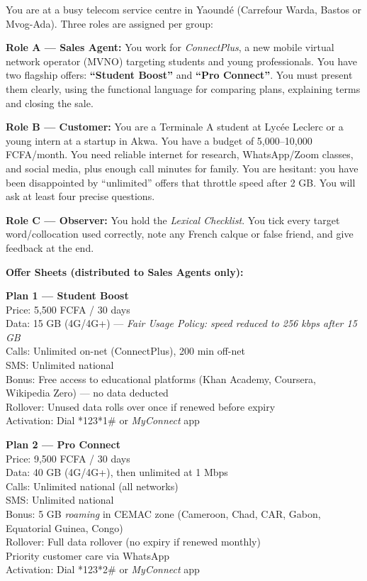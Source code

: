 \documentclass[11pt]{article}
\newcounter{popsec}
\newcounter{popsub}
\newcommand{\courssub}[1]{%
  \stepcounter{popsub}%
  \par\vspace{9pt}\noindent{\popxbold\fontsize{11.5}{13}\selectfont\color{popink}{\color{poporange}\thepopsec.\thepopsub}\hspace{6pt}#1}\par\nopagebreak\vspace{4pt}
}
\begin{document}
\courssub{Situation}
\begin{textebox}
You are at a busy telecom service centre in Yaoundé (Carrefour Warda, Bastos or Mvog-Ada). Three roles are assigned per group:

\textbf{Role A — Sales Agent:} You work for \textit{ConnectPlus}, a new mobile virtual network operator (MVNO) targeting students and young professionals. You have two flagship offers: \textbf{“Student Boost”} and \textbf{“Pro Connect”}. You must present them clearly, using the functional language for comparing plans, explaining terms and closing the sale.

\textbf{Role B — Customer:} You are a Terminale A student at Lycée Leclerc or a young intern at a startup in Akwa. You have a budget of 5,000–10,000 FCFA/month. You need reliable internet for research, WhatsApp/Zoom classes, and social media, plus enough call minutes for family. You are hesitant: you have been disappointed by “unlimited” offers that throttle speed after 2 GB. You will ask at least four precise questions.

\textbf{Role C — Observer:} You hold the \textit{Lexical Checklist}. You tick every target word/collocation used correctly, note any French calque or false friend, and give feedback at the end.

\textbf{Offer Sheets (distributed to Sales Agents only):}

\textbf{Plan 1 — Student Boost} \\
Price: 5,500 FCFA / 30 days \\
Data: 15 GB (4G/4G+) — \textit{Fair Usage Policy: speed reduced to 256 kbps after 15 GB} \\
Calls: Unlimited on-net (ConnectPlus), 200 min off-net \\
SMS: Unlimited national \\
Bonus: Free access to educational platforms (Khan Academy, Coursera, Wikipedia Zero) — no data deducted \\
Rollover: Unused data rolls over once if renewed before expiry \\
Activation: Dial *123*1\# or \textit{MyConnect} app

\textbf{Plan 2 — Pro Connect} \\
Price: 9,500 FCFA / 30 days \\
Data: 40 GB (4G/4G+), then unlimited at 1 Mbps \\
Calls: Unlimited national (all networks) \\
SMS: Unlimited national \\
Bonus: 5 GB \textit{roaming} in CEMAC zone (Cameroon, Chad, CAR, Gabon, Equatorial Guinea, Congo) \\
Rollover: Full data rollover (no expiry if renewed monthly) \\
Priority customer care via WhatsApp \\
Activation: Dial *123*2\# or \textit{MyConnect} app


\end{textebox}
\end{document}
